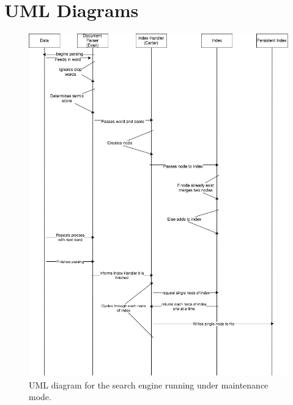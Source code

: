 \documentclass{article}
\begin{document}
\section{UML Diagrams}

\begin{figure}[H]
  \centering
  \includegraphics[width=\linewidth]{DS_Maintenance.jpg}
  \caption{UML diagram for the search engine running under maintenance mode.}
\end{figure}
\end{document}
